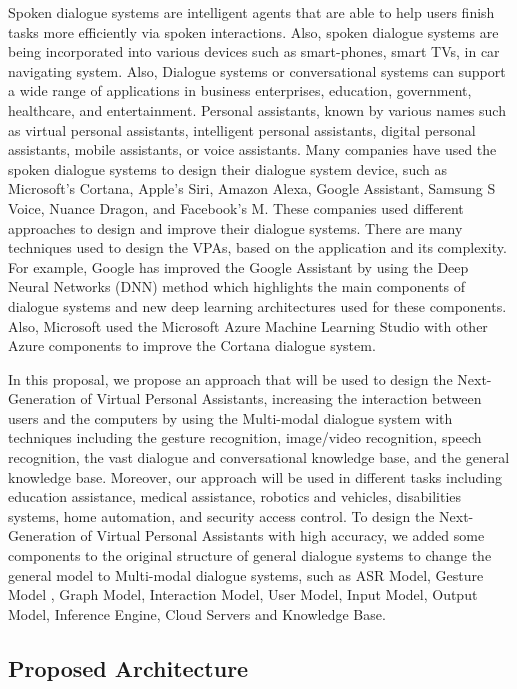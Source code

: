 \documentclass[12pt,a4paper]{article}
\begin{document}
Spoken dialogue systems are intelligent agents that are able
to help users finish tasks more efficiently via spoken
interactions. Also, spoken dialogue systems are being
incorporated into various devices such as smart-phones, smart
TVs, in car navigating system. Also, Dialogue systems or
conversational systems can support a wide range of
applications in business enterprises, education, government,
healthcare, and entertainment. Personal assistants, known by
various names such as virtual personal assistants, intelligent personal assistants, digital personal assistants, mobile
assistants, or voice assistants.
Many companies have used the spoken dialogue systems to
design their dialogue system device, such as Microsoft’s
Cortana, Apple’s Siri, Amazon Alexa, Google Assistant,
Samsung S Voice, Nuance Dragon, and Facebook’s M. These
companies used different approaches to design and improve
their dialogue systems. There are many techniques used to
design the VPAs, based on the application and its complexity.
For example, Google has improved the Google Assistant by
using the Deep Neural Networks (DNN) method which
highlights the main components of dialogue systems and new
deep learning architectures used for these components.
Also, Microsoft used the Microsoft Azure Machine Learning
Studio with other Azure components to improve the Cortana
dialogue system.
\par

\par  
In this proposal, we propose an approach that will be used to
design the Next-Generation of Virtual Personal Assistants,
increasing the interaction between users and the computers by
using the Multi-modal dialogue system with techniques
including the gesture recognition, image/video recognition,
speech recognition, the vast dialogue and conversational
knowledge base, and the general knowledge base. Moreover,
our approach will be used in different tasks including education
assistance, medical assistance, robotics and vehicles,
disabilities systems, home automation, and security access
control. To design the
Next-Generation of Virtual Personal Assistants with high
accuracy, we added some components to the original structure
of general dialogue systems to change the general model to
Multi-modal dialogue systems, such as ASR Model, Gesture
Model , Graph Model, Interaction Model, User Model, Input
Model, Output Model, Inference Engine, Cloud Servers and
Knowledge Base.


\newpage
\begin{center}
\section{Proposed Architecture}
\end{center}
\end{document}
